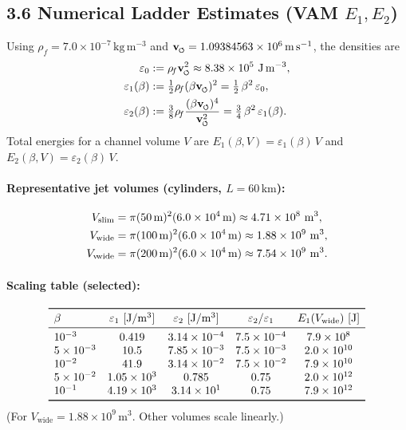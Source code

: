 \documentclass[reprint,aps,onecolumn,nofootinbib]{revtex4-2}
\newcommand{\swirlarrow}{%
    \mathchoice{\mkern-2mu\scriptstyle\boldsymbol{\circlearrowleft}}%
    {\mkern-2mu\scriptstyle\boldsymbol{\circlearrowleft}}%
    {\mkern-2mu\scriptscriptstyle\boldsymbol{\circlearrowleft}}%
    {\mkern-2mu\scriptscriptstyle\boldsymbol{\circlearrowleft}}%
}
\newcommand{\vswirl}{\mathbf{v}_{\swirlarrow}}
\newcommand{\rhof}{\rho_{\!f}}                           %
\newcommand{\Ce}{\vswirl}
\begin{document}
\subsection*{3.6 Numerical Ladder Estimates (VAM \texorpdfstring{$E_1,E_2$}{E1,E2})}

Using $\rhof = 7.0\times 10^{-7}\,\mathrm{kg\,m^{-3}}$ and $\Ce = 1.09384563\times 10^6\,\mathrm{m\,s^{-1}}$, the densities are
\begin{align}
\varepsilon_0 &:= \rhof \Ce^2 \approx 8.38\times 10^{5}\ \mathrm{J\,m^{-3}},\\
\varepsilon_1(\beta) &:= \tfrac{1}{2}\rhof (\beta\Ce)^2
= \tfrac{1}{2}\,\beta^2\,\varepsilon_0,\\
\varepsilon_2(\beta) &:= \tfrac{3}{8}\rhof \frac{(\beta\Ce)^4}{\Ce^2}
= \tfrac{3}{4}\,\beta^2\,\varepsilon_1(\beta).
\end{align}
Total energies for a channel volume $V$ are $E_1(\beta,V)=\varepsilon_1(\beta)\,V$ and $E_2(\beta,V)=\varepsilon_2(\beta)\,V$.

\paragraph{Representative jet volumes (cylinders, $L=60\,\mathrm{km}$):}
    \[
        \begin{aligned}
        V_{\text{slim}} &= \pi (50\,\mathrm{m})^2 (6.0\times 10^4\,\mathrm{m}) \approx 4.71\times 10^{8}\ \mathrm{m^3},\\
        V_{\text{wide}} &= \pi (100\,\mathrm{m})^2 (6.0\times 10^4\,\mathrm{m}) \approx 1.88\times 10^{9}\ \mathrm{m^3},\\
        V_{\text{v\!wide}} &= \pi (200\,\mathrm{m})^2 (6.0\times 10^4\,\mathrm{m}) \approx 7.54\times 10^{9}\ \mathrm{m^3}.
        \end{aligned}
    \]

\paragraph{Scaling table (selected):}
    \[
        \begin{array}{lcccc}
        \toprule
        \beta & \varepsilon_1\ [\mathrm{J/m^3}] & \varepsilon_2\ [\mathrm{J/m^3}] & \varepsilon_2/\varepsilon_1 & E_1(V_{\text{wide}})\ [\mathrm{J}]\\
        \midrule
        10^{-3} & 0.419 & 3.14\times 10^{-4} & 7.5\times 10^{-4} & 7.9\times 10^{8} \\
        5\times 10^{-3} & 10.5 & 7.85\times 10^{-3} & 7.5\times 10^{-3} & 2.0\times 10^{10} \\
        10^{-2} & 41.9 & 3.14\times 10^{-2} & 7.5\times 10^{-2} & 7.9\times 10^{10} \\
        5\times 10^{-2} & 1.05\times 10^{3} & 0.785 & 0.75 & 2.0\times 10^{12} \\
        10^{-1} & 4.19\times 10^{3} & 3.14\times 10^{1} & 0.75 & 7.9\times 10^{12} \\
        \bottomrule
        \end{array}
    \]
    (For $V_{\text{wide}}=1.88\times 10^9\,\mathrm{m^3}$. Other volumes scale linearly.)
\end{document}
